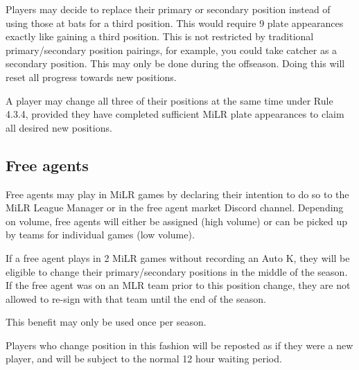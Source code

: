 \begin{deepEnumerate}
    \item Players may decide to replace their primary or secondary position instead of using those at bats for a third position. 
    This would require 9 plate appearances exactly like gaining a third position. This is not restricted by traditional primary/secondary position pairings, 
    for example, you could take catcher as a secondary position. This may only be done during the offseason. Doing this will reset all progress towards new positions.
    \begin{deepEnumerate}
        \item A player may change all three of their positions at the same time under Rule 4.3.4, provided they have completed sufficient MiLR plate appearances
        to claim all desired new positions.
    \end{deepEnumerate}
\end{deepEnumerate}

\subsection{Free agents}
\begin{deepEnumerate}
    \item Free agents may play in MiLR games by declaring their intention to do so to the MiLR League Manager or in the free agent market Discord channel. 
    Depending on volume, free agents will either be assigned (high volume) or can be picked up by teams for individual games (low volume).
    \item If a free agent plays in 2 MiLR games without recording an Auto K, they will be eligible to change their primary/secondary positions in the middle of the season. 
    If the free agent was on an MLR team prior to this position change, they are not allowed to re-sign with that team until the end of the season.
    \begin{deepEnumerate}
        \item This benefit may only be used once per season.
        \item Players who change position in this fashion will be reposted as if they were a new player, and will be subject to the normal 12 hour waiting period.        
    \end{deepEnumerate}
\end{deepEnumerate}
